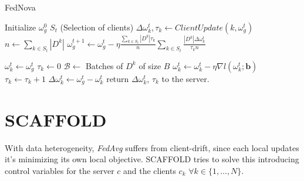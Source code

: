 \begin{algorithm}[H]
  \label{alg:FedNova}
  \caption{FedNova}
  \begin{algorithmic}[1]
    \Statex
    \State Initialize $\omega_g^0$
      \State $S_t$  (Selection of clients)
        \State $\Delta \omega_k^{t}, \tau_k \gets ClientUpdate(k, \omega_g^t)$
      \EndFor
      \State $n \gets \sum_{k \in S_t} |D^k|$
      \State $\omega_g^{t+1} \gets \omega_g^t - \eta \frac{\sum_{k \in S_t} |D^k| \tau_k}{n} \sum_{k \in S_t} \frac{|D^k| \Delta \omega_k^t}{\tau_k n}$
    \EndFor
    \EndProcedure

    \State $\omega_k^t \gets \omega_g^t$
    \State $\tau_k \gets 0$
    \State $\mathcal{B} \gets$ Batches of $D^k$ of size $B$
        \State $\omega_k^t \gets \omega_k^t - \eta \nabla l(\omega_k^t; \mathbf{b})$
        \State $\tau_k \gets \tau_k + 1$
      \EndFor
    \EndFor
    \State $\Delta \omega_k^t \gets \omega_g^t - \omega_k^t$
    \State return $\Delta \omega_k^t$, $\tau_k$  to the server.
    \EndProcedure
  \end{algorithmic}
\end{algorithm}


\section{SCAFFOLD}

With data heterogeneity, \textit{FedAvg} suffers from client-drift, since each local updates it's minimizing its own local objective. SCAFFOLD tries to solve this introducing control variables for the server $c$ and the clients $c_k$ $\forall k \in \{1,\dots, N\}$.

